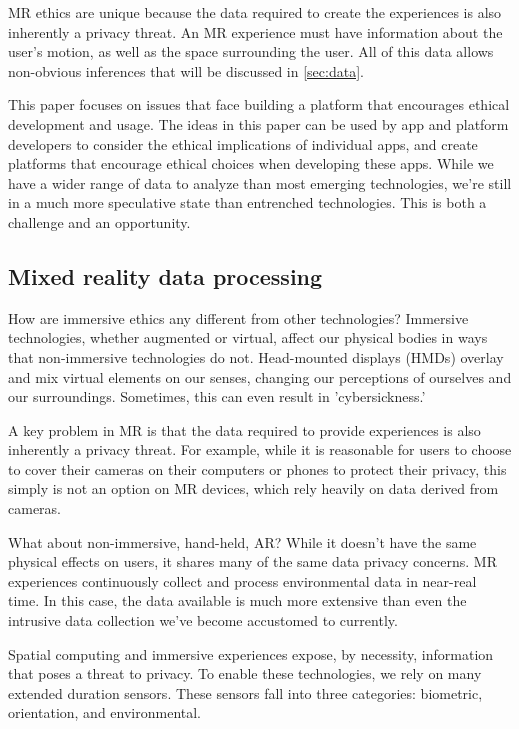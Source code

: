 MR ethics are unique because the data required to create the experiences is also inherently a privacy threat. An MR experience must have information about the user's motion, as well as the space surrounding the user. All of this data allows non-obvious inferences that will be discussed in \autoref{sec:data}.

This paper focuses on issues that face building a platform that encourages ethical development and usage. The ideas in this paper can be used by app and platform developers to consider the ethical implications of individual apps, and create platforms that encourage ethical choices when developing these apps. While we have a wider range of data to analyze than most emerging technologies, we're still in a much more speculative state than entrenched technologies. This is both a challenge and an opportunity.

\subsection{Mixed reality data processing}\label{sec:data}

How are immersive ethics any different from other technologies? Immersive technologies, whether augmented or virtual, affect our physical bodies in ways that non-immersive technologies do not. Head-mounted displays (HMDs) overlay and mix virtual elements on our senses, changing our perceptions of ourselves and our surroundings. Sometimes, this can even result in 'cybersickness.'

A key problem in MR is that the data required to provide experiences is also inherently a privacy threat. For example, while it is reasonable for users to choose to cover their cameras on their computers or phones to protect their privacy, this simply is not an option on MR devices, which rely heavily on data derived from cameras.

What about non-immersive, hand-held, AR? While it doesn't have the same physical effects on users, it shares many of the same data privacy concerns. MR experiences continuously collect and process environmental data in near-real time. In this case, the data available is much more extensive than even the intrusive data collection we've become accustomed to currently.

Spatial computing and immersive experiences expose, by necessity, information that poses a threat to privacy. To enable these technologies, we rely on many extended duration sensors. These sensors fall into three categories: biometric, orientation, and environmental.

